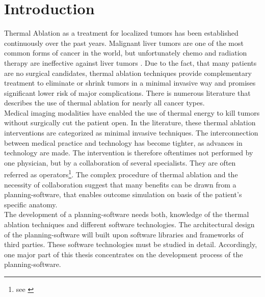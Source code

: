 \chapter*{Introduction}

Thermal Ablation as a treatment for localized tumors has been established continuously over the past years. Malignant liver tumors are one of the most common forms of cancer in the world, but unfortunately chemo and radiation therapy are ineffective against liver tumors \cite{dodd-2000}. Due to the fact, that many patients are no surgical candidates, thermal ablation techniques provide complementary treatment to eliminate or shrink tumors in a minimal invasive way and promises significant lower risk of major complications. There is numerous literature that describes the use of thermal ablation for nearly all cancer types. 
\\
Medical imaging modalities have enabled the use of thermal energy to kill tumors without surgically cut the patient open. In the literature, these thermal ablation interventions are categorized as minimal invasive techniques. 
The interconnection between medical practice and technology has become tighter, as advances in technology are made. The intervention is therefore oftentimes not performed by one physician, but by a collaboration of several specialists. They are often referred as operators\footnote{see \cite{poon-rf}}. The complex procedure of thermal ablation and the necessity of collaboration suggest that  many benefits can be drawn from a planning-software, that enables outcome simulation on basis of the patient's specific anatomy.
\\ 
The development of a planning-software needs both, knowledge of the thermal ablation techniques and different software technologies. 
The architectural design of the planning-software will built upon software libraries and frameworks of third parties. These software technologies must be studied in detail. Accordingly, one major part of this thesis concentrates on the development process of the planning-software. 

